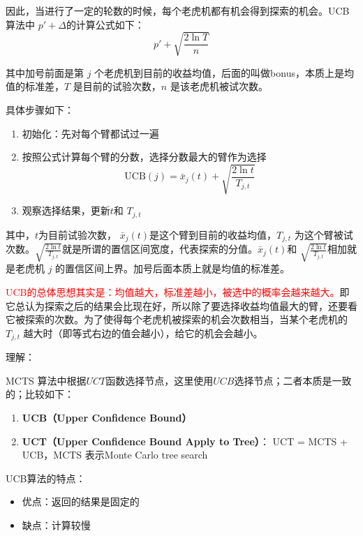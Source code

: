 \documentclass[12pt]{article}
\begin{document}
因此，当进行了一定的轮数的时候，每个老虎机都有机会得到探索的机会。UCB算法中 $p' +  \Delta $的计算公式如下：
$$
p' + \sqrt{\frac{2\ln T}{n}}
$$

其中加号前面是第 $j$ 个老虎机到目前的收益均值，后面的叫做bonus，本质上是均值的标准差，$T$ 是目前的试验次数，$n$ 是该老虎机被试次数。

具体步骤如下：
\begin{enumerate}
\setlength{\itemsep}{0pt}
\setlength{\parsep}{0pt}
\setlength{\parskip}{0pt}
    \item 初始化：先对每个臂都试过一遍
    \item 按照公式计算每个臂的分数，选择分数最大的臂作为选择
    $$
    	\text{UCB}(j) = \bar{x}_j(t) + \sqrt{\frac{2\ln{t}}{T_{j,t}}}
    $$
    \item 观察选择结果，更新$t$和 $T_{j,t}$
\end{enumerate}

其中，$t$为目前试验次数，  $\bar{x}_j(t)$是这个臂到目前的收益均值，$T_{j,t}$ 为这个臂被试次数。$\sqrt{\frac{2\ln{t}}{T_{j,t}}}$就是所谓的置信区间宽度，代表探索的分值。$\bar{x}_j(t) $和 $\sqrt{\frac{2\ln{t}}{T_{j,t}}}$相加就是老虎机 $j$ 的置信区间上界。加号后面本质上就是均值的标准差。

\textcolor{red}{UCB的总体思想其实是：均值越大，标准差越小，被选中的概率会越来越大。}即它总认为探索之后的结果会比现在好，所以除了要选择收益均值最大的臂，还要看它被探索的次数。为了使得每个老虎机被探索的机会次数相当，当某个老虎机的$T_{j,t}$ 越大时（即等式右边的值会越小），给它的机会会越小。

\begin{framed}
理解：

MCTS 算法中根据$UCT$函数选择节点，这里使用$UCB$选择节点；二者本质是一致的；比较如下：
\begin{enumerate}
\setlength{\itemsep}{0pt}
\setlength{\parsep}{0pt}
\setlength{\parskip}{0pt}
    \item \textbf{UCB（Upper Confidence Bound）}
    \item \textbf{UCT（Upper Confidence Bound Apply to Tree）}： UCT = MCTS + UCB，MCTS 表示Monte Carlo tree search
\end{enumerate}

\end{framed}

UCB算法的特点：
\begin{itemize}
\setlength{\itemsep}{0pt}
\setlength{\parsep}{0pt}
\setlength{\parskip}{0pt}
    \item 优点：返回的结果是固定的
    \item 缺点：计算较慢
\end{itemize}
\end{document}
